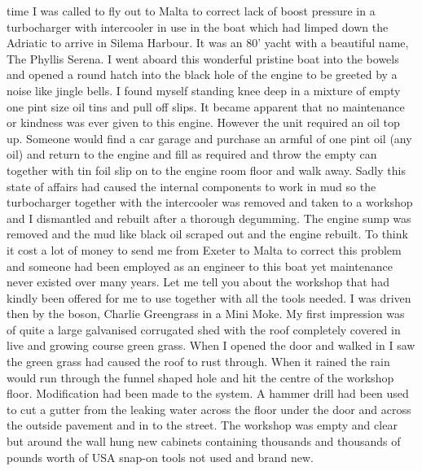 time I was called to fly out to Malta to correct lack of boost pressure in a
turbocharger with intercooler in use in the boat which had limped down the
Adriatic to arrive in Silema Harbour. It was an 80' yacht with a beautiful
name, The Phyllis Serena. I went aboard this wonderful pristine boat into the
bowels and opened a round hatch into the black hole of the engine to be greeted
by a noise like jingle bells. I found myself standing knee deep in a mixture
of empty one pint size oil tins and pull off slips. It became apparent that no
maintenance or kindness was ever given to this engine. However the unit
required an oil top up. Someone would find a car garage and purchase an armful
of one pint oil (any oil) and return to the engine and fill as required and
throw the empty can together with tin foil slip on to the engine room floor and
walk away. Sadly this state of affairs had caused the internal components to
work in mud so the turbocharger together with the intercooler was removed and
taken to a workshop and I dismantled and rebuilt after a thorough degumming.
The engine sump was removed and the mud like black oil scraped out and the
engine rebuilt. To think it cost a lot of money to send me from Exeter to
Malta to correct this problem and someone had been employed as an engineer to
this boat yet maintenance never existed over many years. Let me tell you about
the workshop that had kindly been offered for me to use together with all the
tools needed. I was driven then by the boson, Charlie Greengrass in a Mini
Moke. My first impression was of quite a large galvanised corrugated shed with
the roof completely covered in live and growing course green grass. When I
opened the door and walked in I saw the green grass had caused the roof to rust
through. When it rained the rain would run through the funnel shaped hole and
hit the centre of the workshop floor. Modification had been made to the
system. A hammer drill had been used to cut a gutter from the leaking water
across the floor under the door and across the outside pavement and in to the
street. The workshop was empty and clear but around the wall hung new cabinets
containing thousands and thousands of pounds worth of USA snap-on tools not
used and brand new.
